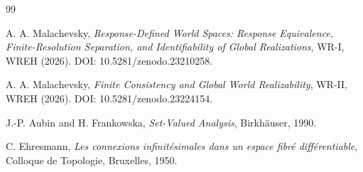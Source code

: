\documentclass[11pt]{article}
\begin{document}
\begin{thebibliography}{99}

A. A. Malachevsky,
\emph{Response-Defined World Spaces: Response Equivalence,
Finite-Resolution Separation, and Identifiability of Global Realizations},
WR-I, WREH (2026).
DOI: 10.5281/zenodo.23210258.

A. A. Malachevsky,
\emph{Finite Consistency and Global World Realizability},
WR-II, WREH (2026).
DOI: 10.5281/zenodo.23224154.

J.-P. Aubin and H. Frankowska,
\emph{Set-Valued Analysis},
Birkh\"auser, 1990.

C. Ehresmann,
\emph{Les connexions infinit\'esimales dans un espace fibr\'e
diff\'erentiable},
Colloque de Topologie, Bruxelles, 1950.

\end{thebibliography}
\end{document}
